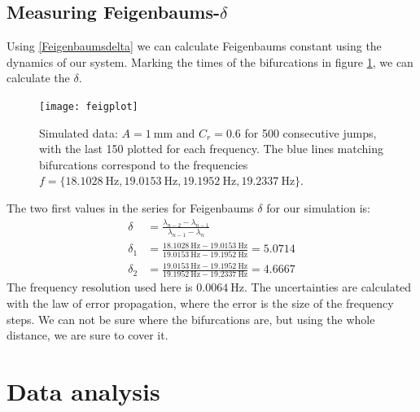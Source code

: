 \documentclass[12pt,oneside,a4paper]{article}
\numberwithin{equation}{section}
\begin{document}
{{{{\subsection{Measuring Feigenbaums-$\delta$}
Using \eqref{Feigenbaumsdelta} we can calculate Feigenbaums constant using the dynamics of our system. Marking the times of the bifurcations in figure  \ref{feigsim}, we can calculate the $\delta$.
\begin{figure}[h]
\centering
\texttt{[image: feigplot]} 
\caption{Simulated data: $A=\SI{1}{\mm}$ and $C_r=\num{0.6}$ for 500 consecutive jumps, with the last 150 plotted for each frequency. The blue lines matching bifurcations correspond to the frequencies $f=\{\SI{18.1028}{\hertz},\SI{19.0153}{\hertz},\SI{19.1952}{\hertz},\SI{19.2337}{\hertz} \}$.}\label{feigsim}
\end{figure}
The two first values in the series for Feigenbaums $\delta$ for our simulation is:
\begin{align}
\delta&=\frac{\lambda_{n-2} - \lambda_{n-1}}{\lambda_{n-1}-\lambda_n}\\
\delta_1&=\frac{\SI{18.1028}{\hertz}-\SI{19.0153}{\hertz}}{\SI{19.0153}{\hertz}-\SI{19.1952}{\hertz}} = 5.0714\\
\delta_2&=\frac{\SI{19.0153}{\hertz}-\SI{19.1952}{\hertz}}{\SI{19.1952}{\hertz}-\SI{19.2337}{\hertz}} = 4.6667
\end{align}
The frequency resolution used here is $\SI{0.0064}{\hertz}$. The uncertainties are calculated with the law of error propagation, where the error is the size of the frequency steps. We can not be sure where the bifurcations are, but using the whole distance, we are sure to cover it.  
\section{Data analysis}
}}}}
\end{document}
